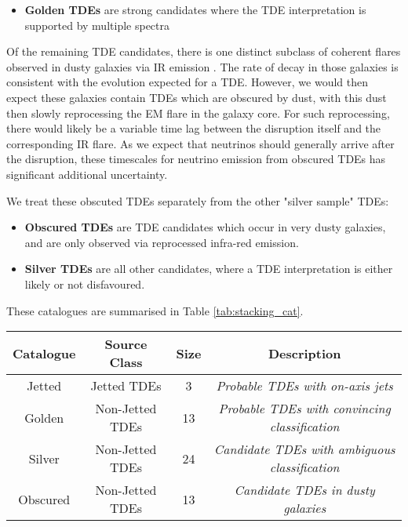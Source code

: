 \begin{itemize}
	\item \textbf{Golden TDEs} are strong candidates where the TDE interpretation is supported by multiple spectra
\end{itemize}

Of the remaining TDE candidates, there is one distinct subclass of coherent flares observed in dusty galaxies via IR emission . The rate of decay in those galaxies is consistent with the evolution expected for a TDE. However, we would then expect these galaxies contain TDEs which are obscured by dust, with this dust then slowly reprocessing the EM flare in the galaxy core.  For such reprocessing, there would likely be a variable time lag between the disruption itself and the corresponding IR flare. As we expect that neutrinos should generally arrive after the disruption, these timescales for neutrino emission from obscured TDEs has significant additional uncertainty. 

We treat these obscuted TDEs separately from the other "silver sample" TDEs:

\begin{itemize}
		\item \textbf{Obscured TDEs} are TDE candidates which occur in very dusty galaxies, and are only observed via reprocessed infra-red emission. 
	\item \textbf{Silver TDEs} are all other candidates, where a TDE interpretation is either likely or not disfavoured.
\end{itemize}

These catalogues are summarised in Table \ref{tab:stacking_cat}.

\begin{table*}[]
	\centering
	\begin{tabular}{||c c c c |} 
		\hline
		Catalogue & Source Class & Size & Description \\ [0.5ex] 
		\hline\hline
		Jetted & Jetted TDEs &  3 & \textit{Probable TDEs with on-axis jets}\\ 
		\hline
		Golden & Non-Jetted TDEs & 13 & \textit{Probable TDEs with convincing classification}\\
		\hline
		Silver & Non-Jetted TDEs & 24 & \textit{Candidate TDEs with ambiguous classification}\\
		\hline
		Obscured & Non-Jetted TDEs & 13 & \textit{Candidate TDEs in dusty galaxies}\\[1ex] 
		\hline
	\end{tabular}
	\caption{Summary of the four TDE catalogues..}
	\label{tab:stacking_cat}
\end{table*}{}


